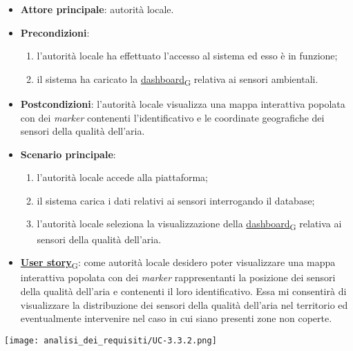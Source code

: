 \begin{itemize}
	\item \textbf{Attore principale}: autorità locale.
	\item \textbf{Precondizioni}:
	      \begin{enumerate}
		      \item l'autorità locale ha effettuato l'accesso al sistema ed esso è in funzione;
		      \item il sistema ha caricato la \href{https://7last.github.io/docs/pb/documentazione-interna/glossario\#dashboard}{dashboard\textsubscript{G}} relativa ai sensori ambientali.
	      \end{enumerate}
	\item \textbf{Postcondizioni}: l'autorità locale visualizza una mappa interattiva popolata con dei \textit{marker} contenenti l'identificativo e le coordinate geografiche dei sensori della qualità dell'aria.
	\item \textbf{Scenario principale}:
	      \begin{enumerate}
		      \item l'autorità locale accede alla piattaforma;
		      \item il sistema carica i dati relativi ai sensori interrogando il database;
		      \item l'autorità locale seleziona la visualizzazione della \href{https://7last.github.io/docs/pb/documentazione-interna/glossario\#dashboard}{dashboard\textsubscript{G}} relativa ai sensori della qualità dell'aria.
	      \end{enumerate}
	\item \href{https://7last.github.io/docs/pb/documentazione-interna/glossario\#user-story}{\textbf{User story}\textsubscript{G}}:
	      come autorità locale desidero poter visualizzare una mappa interattiva popolata con dei \textit{marker} rappresentanti la posizione dei sensori della qualità dell'aria
	      e contenenti il loro identificativo. Essa mi consentirà di visualizzare la distribuzione dei sensori della qualità dell'aria nel territorio ed eventualmente intervenire nel caso in cui siano presenti zone non coperte.
\end{itemize}
\begin{center}
	\texttt{[image: analisi\_dei\_requisiti/UC-3.3.2.png]}
\end{center}


